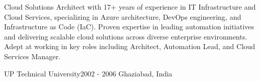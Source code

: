 
Cloud Solutions Architect with 17+ years of experience in IT Infrastructure and Cloud Services, specializing in Azure architecture, DevOps engineering, and Infrastructure as Code (IaC). Proven expertise in leading automation initiatives and delivering scalable cloud solutions across diverse enterprise environments. Adept at working in key roles including Architect, Automation Lead, and Cloud Services Manager.

 {UP Technical University}{2002 - 2006} {Ghaziabad, India}

 {}{}{}
 {}{}{}
 {}{}{}

{}
{}
{}
{}
{}
{}

{}
{}
